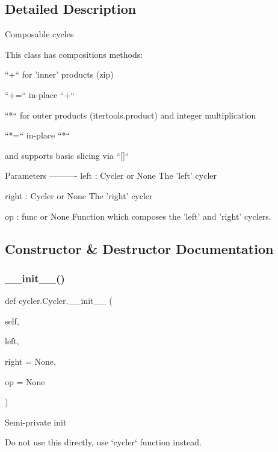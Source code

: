 \subsection{Detailed Description}
\begin{DoxyVerb}Composable cycles

This class has compositions methods:

``+``
  for 'inner' products (zip)

``+=``
  in-place ``+``

``*``
  for outer products (itertools.product) and integer multiplication

``*=``
  in-place ``*``

and supports basic slicing via ``[]``

Parameters
----------
left : Cycler or None
    The 'left' cycler

right : Cycler or None
    The 'right' cycler

op : func or None
    Function which composes the 'left' and 'right' cyclers.\end{DoxyVerb}
 

\subsection{Constructor \& Destructor Documentation}
\mbox{\label{classcycler_1_1Cycler_a3b39bffad8da36418975e7cd386db883}} 
\subsubsection{\texorpdfstring{\+\_\+\+\_\+init\+\_\+\+\_\+()}{\_\_init\_\_()}}
{\footnotesize\ttfamily def cycler.\+Cycler.\+\_\+\+\_\+init\+\_\+\+\_\+ (\begin{DoxyParamCaption}\item[{}]{self,  }\item[{}]{left,  }\item[{}]{right = {\ttfamily None},  }\item[{}]{op = {\ttfamily None} }\end{DoxyParamCaption})}

\begin{DoxyVerb}Semi-private init

Do not use this directly, use `cycler` function instead.
\end{DoxyVerb}
 

